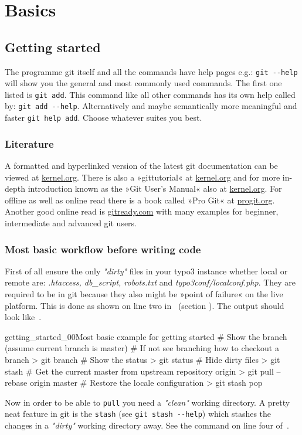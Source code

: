 \section{Basics}
\subsection{Getting started}
The programme git itself and all the commands have help pages e.g.: \texttt{git -{}-help} will show you the general and most commonly used commands. The first one listed is \texttt{git add}. This command like all other commands has its own help called by: \texttt{git add -{}-help}. Alternatively and maybe semantically more meaningful and faster \texttt{git help add}. Choose whatever suites you best.
\subsubsection{Literature}
A formatted and hyperlinked version of the latest git documentation can be viewed at \href{http://www.kernel.org/pub/software/scm/git/docs/}{kernel.org}. There is also a »gittutorial« at \href{http://www.kernel.org/pub/software/scm/git/docs/gittutorial.html}{kernel.org} and for more in-depth introduction known as the »Git User’s Manual« also at \href{http://www.kernel.org/pub/software/scm/git/docs/user-manual.html}{kernel.org}. For offline as well as online read there is a book called »Pro Git« at \href{http://progit.org/}{progit.org}. Another good online read is \href{http://gitready.com/}{gitready.com} with many examples for beginner, intermediate and advanced git users.
\subsubsection{Most basic workflow before writing code}
First of all ensure the only \textit{"dirty"} files in your typo3 instance whether local or remote are: \textit{.htaccess, db\_script, robots.txt} and \textit{typo3conf/localconf.php}. They are required to be in git because they also might be »point of failure« on the live platform. This is done as shown on line two in~ (section ). The output should look like~. 
\begin{codelisting}{getting_started_00}{Most basic example for getting started}
# Show the branch (assume current branch is master)
# If not see branching how to checkout a branch 
> git branch
# Show the status
> git status
# Hide dirty files
> git stash
# Get the current master from upstream repository origin
> git pull --rebase origin master 
# Restore the locale configuration
> git stash pop 
\end{codelisting}
Now in order to be able to \texttt{pull} you need a \textit{"clean"} working directory. A pretty neat feature in git is the \texttt{stash} (see \texttt{git stash -{}-help}) which stashes the changes in a \textit{"dirty"} working directory away. See the command on line four of~.

